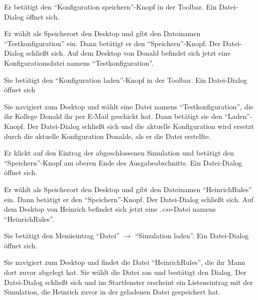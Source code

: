 \documentclass[parskip=full,11pt]{scrartcl}
\begin{document}
{Er betätigt den \enquote{\Gls{Konfiguration} speichern}-Knopf in der Toolbar.}
{Ein Datei-Dialog öffnet sich.}

{Er wählt als Speicherort den Desktop und gibt den Dateinamen \enquote{Testkonfiguration} ein. Dann betätigt er den \enquote{Speichern}-Knopf.}
{Der Datei-Dialog schließt sich. Auf dem Desktop von Donald befindet sich jetzt eine Konfigurationsdatei namens \enquote{Testkonfiguration}.}

{Sie betätigt den \enquote{\Gls{Konfiguration} laden}-Knopf in der Toolbar.}
{Ein Datei-Dialog öffnet sich}

{Sie navigiert zum Desktop und wählt eine Datei namens \enquote{Testkonfiguration}, die ihr Kollege Donald ihr per E-Mail geschickt hat. Dann betätigt sie den \enquote{Laden}-Knopf.}
{Der Datei-Dialog schließt sich und die \gls{aktuelle Konfiguration} wird ersetzt durch die \gls{aktuelle Konfiguration} Donalds, als er die Datei erstellte.}

{Er klickt auf den Eintrag der abgeschlossenen Simulation und betätigt den \enquote{Speichern}-Knopf am oberen Ende des Ausgabeabschnitts.}
{Ein Datei-Dialog öffnet sich.}

{Er wählt als Speicherort den Desktop und gibt den Dateinamen \enquote{HeinrichRules} ein. Dann betätigt er den \enquote{Speichern}-Knopf.}
{Der Datei-Dialog schließt sich. Auf dem Desktop von Heinrich befindet sich jetzt eine \textit{.csv}-Datei namens \enquote{HeinrichRules}.}

{Sie betätigt den Menüeintrag \enquote{Datei} \(\rightarrow\) \enquote{Simulation laden}.}
{Ein Datei-Dialog öffnet sich.}

{Sie navigiert zum Desktop und findet die Datei \enquote{HeinrichRules}, die ihr Mann dort zuvor abgelegt hat. Sie wählt die Datei aus und bestätigt den Dialog.}
{Der Datei-Dialog schließt sich und im Startfenster erscheint ein Listeneintrag mit der Simulation, die Heinrich zuvor in der geladenen Datei gespeichert hat.}
\end{document}
